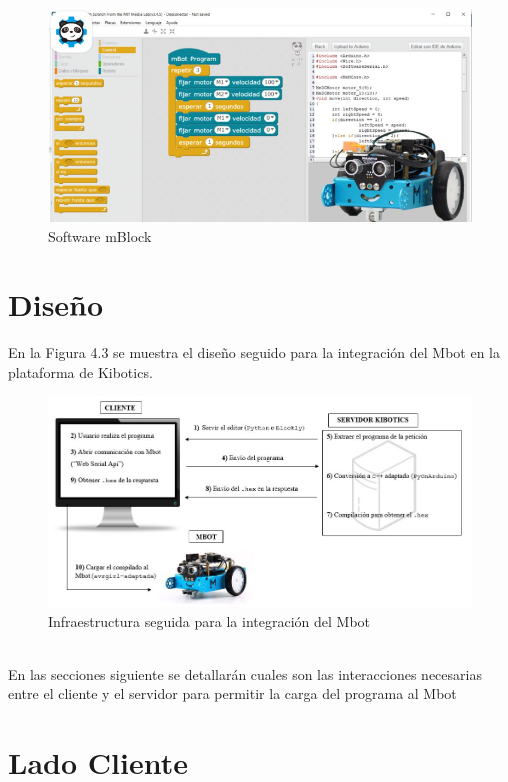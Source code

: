 \documentclass{report}
\begin{document}
\\
\begin{figure}[h!]
  \centering
    \includegraphics[width=1\textwidth]{images/software_mBlock.png}
  \caption{Software mBlock}
  \label{Software mBlock}
\end{figure}

\section{Diseño}

En la Figura 4.3 se muestra el diseño seguido para la integración del Mbot en la plataforma de Kibotics.
\\
\begin{figure}[h!]
  \centering
    \includegraphics[width=1\textwidth]{images/infraestructura_mbot.png}
  \caption{Infraestructura seguida para la integración del Mbot}
  \label{Infraestructura seguida para la integración del Mbot}
\end{figure}
\\
En las secciones siguiente se detallarán cuales son las interacciones necesarias entre el cliente y el servidor para permitir la carga del programa al Mbot

\section{Lado Cliente}
\end{document}

